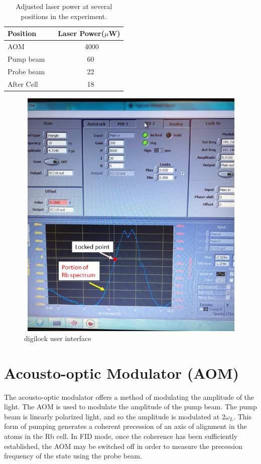 \begin{table}[h]
\centering
\begin{tabular}{|l | l|}
\hline

\textbf{ Position}    & \textbf{Laser Power($\mu$W)} \\
\hline

AOM ~&  ~ ~ ~ ~ ~4000  \\

Pump beam ~  &  ~ ~ ~ ~ ~ 60  \\

Probe beam ~  &  ~ ~ ~ ~ ~ 22  \\
After Cell ~ &  ~ ~ ~ ~ ~ 18   \\

\hline
\end{tabular}
\caption{Adjusted laser power at several positions in the experiment.\label{table:laser power}}
\end{table}
\begin{figure}[h]
\centering
\includegraphics[width=0.6\linewidth]{figures/digilock.png}
\caption{digilock user interface\label{fig:digilock}}
\end{figure}
\section{Acousto-optic Modulator (AOM)\label{sec:AOM}}

The acousto-optic modulator offers a method of modulating the
amplitude of the light.
The AOM is used to modulate the amplitude of the pump beam. The pump beam is linearly polarized light, and so the amplitude
  is modulated at $2\omega_L$. This form of pumping generates a coherent precession of an axis of alignment in the atoms in the Rb cell. In FID mode, once the coherence has been sufficiently established, the AOM may be switched off in order to measure the precession frequency of the state using the probe beam.

